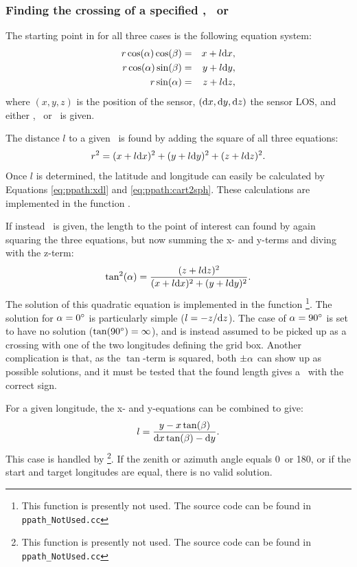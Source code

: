 \subsubsection{Finding the crossing of a specified \Rds, \Lat\ or \Lon}
\label{sec:ppath:3dcross}

The starting point in for all three cases is the following
equation system:
\begin{eqnarray}
  r \cos(\alpha) \cos(\beta)  & = & x+l\mathrm{d} x, \nonumber \\
  r \cos(\alpha) \sin(\beta)  & = & y+l\mathrm{d} y,           \\
  r \sin(\alpha)             & = & z+l\mathrm{d} z, \nonumber 
  \label{eq:ppath:rcoss3Da}
\end{eqnarray}
where $(x,y,z)$ is the position of the sensor, $(\mathrm{d} x,\mathrm{d}
y,\mathrm{d} z)$ the sensor LOS, and either \Rds, \Lat\ or \Lon\ is given.

The distance $l$ to a given \Rds\ is found by adding the square of all three
equations:
\begin{equation}
  r^2 = (x+l\mathrm{d} x)^2 + (y+l\mathrm{d} y)^2 + (z+l\mathrm{d} z)^2.
  \label{eq:ppath:rcoss3Db}
\end{equation}
Once $l$ is determined, the latitude and longitude can easily be
calculated by Equations \ref{eq:ppath:xdl} and
\ref{eq:ppath:cart2sph}. These calculations are implemented in the
function .  

If instead \Lat\ is given, the length to the point of interest can found by
again squaring the three equations, but now summing the x- and y-terms
and diving with the z-term:
\begin{equation}
  \tan^2(\alpha) = \frac{(z+l\mathrm{d} z)^2}{(x+l\mathrm{d} x)^2+(y+l\mathrm{d} y)^2}.
\end{equation}
The solution of this quadratic equation is implemented in the function
\footnote{This function is presently not used. The
  source code can be found in \texttt{ppath\_NotUsed.cc}}. The solution for
$\alpha=0^\circ$ is particularly simple ($l=-z/\mathrm{d} z$). The case of
$\alpha=90^\circ$ is set to have no solution ($\tan(90^\circ)=\infty$), and is
instead assumed to be picked up as a crossing with one of the two longitudes
defining the grid box. Another complication is that, as the $\tan$-term is
squared, both $\pm\alpha$ can show up as possible solutions, and it must be
tested that the found length gives a \Lat\ with the correct sign.

For a given longitude, the x- and y-equations can be combined to give:
\begin{equation}
  l = \frac{y-x\tan(\beta)}{\mathrm{d} x\tan(\beta)-\mathrm{d} y}.
\end{equation}
This case is handled by \footnote{This function is
  presently not used. The source code can be found in
  \texttt{ppath\_NotUsed.cc}}. If the zenith or azimuth angle equals 0\degree\
or 180\degree, or if the start and target longitudes are equal, there is no
valid solution.



